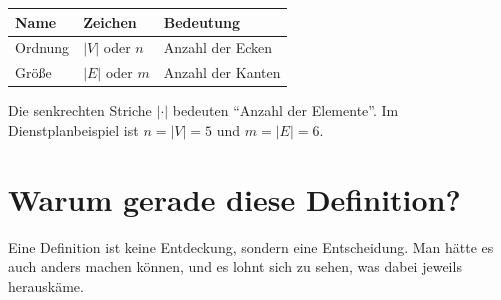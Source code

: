 \begin{merksatz}
\begin{center}
\renewcommand{\arraystretch}{1.5}
\begin{tabular}{@{}P{2.6cm}P{2.0cm}P{3.6cm}@{}}
\toprule
\textbf{Name} & \textbf{Zeichen} & \textbf{Bedeutung}\\
\midrule
Ordnung & $|V|$ oder $n$ & Anzahl der Ecken\\
Größe & $|E|$ oder $m$ & Anzahl der Kanten\\
\bottomrule
\end{tabular}
\end{center}

Die senkrechten Striche $|\cdot|$ bedeuten \enquote{Anzahl der Elemente}. Im Dienstplanbeispiel ist $n = |V| = 5$ und $m = |E| = 6$.

\begin{center}
\begin{minipage}{0.86\textwidth}
\end{minipage}
\end{center}
\end{merksatz}

\section{Warum gerade diese Definition?}

Eine Definition ist keine Entdeckung, sondern eine Entscheidung. Man hätte es auch anders machen können, und es lohnt sich zu sehen, was dabei jeweils herauskäme.

